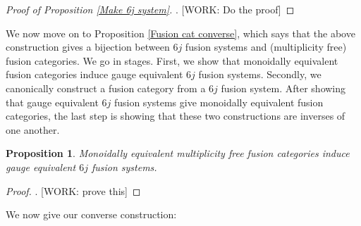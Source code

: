 \documentclass{article}
\newtheorem{proposition}{Proposition}[section]
\theoremstyle{definition}
\numberwithin{figure}{section}
\begin{document}
\begin{proof}[Proof of Proposition \ref{Make 6j system}]. [WORK: Do the proof]
\end{proof}


We now move on to Proposition \ref{Fusion cat converse}, which says that the above construction gives a bijection between $6j$ fusion systems and (multiplicity free) fusion categories. We go in stages. First, we show that monoidally equivalent fusion categories induce gauge equivalent $6j$ fusion systems. Secondly, we canonically construct a fusion category from a $6j$ fusion system. After showing that gauge equivalent $6j$ fusion systems give monoidally equivalent fusion categories, the last step is showing that these two constructions are inverses of one another.

\begin{proposition} Monoidally equivalent multiplicity free fusion categories induce gauge equivalent $6j$ fusion systems.
\end{proposition}
\begin{proof}. [WORK: prove this]
\end{proof}

We now give our converse construction:
\end{document}
